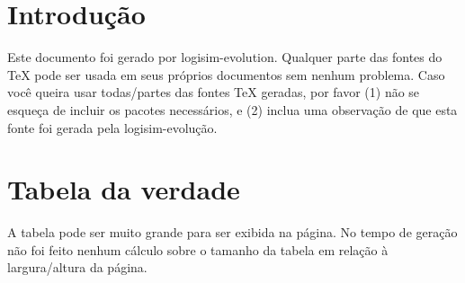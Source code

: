\documentclass [15pt,a4paper,twoside]{article}
\begin{document}
\section{Introdução}
Este documento foi gerado por logisim-evolution. Qualquer parte das fontes do TeX pode ser usada em seus próprios documentos sem nenhum problema. Caso você queira usar todas/partes das fontes TeX geradas, por favor (1) não se esqueça de incluir os pacotes necessários, e (2) inclua uma observação de que esta fonte foi gerada pela logisim-evolução.
\section{Tabela da verdade}
A tabela pode ser muito grande para ser exibida na página. No tempo de geração não foi feito nenhum cálculo sobre o tamanho da tabela em relação à largura/altura da página.
\end{document}
